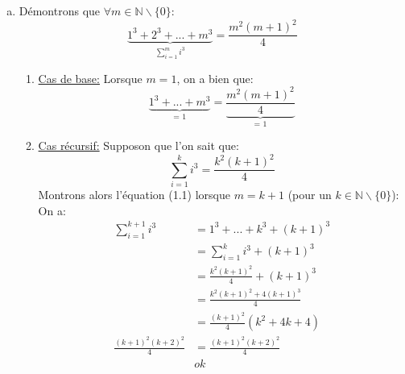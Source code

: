 \documentclass{report}
\begin{document}



  
  
\section{} %
  \begin{enumerate}[a. ]
  \addtocounter{enumi}{1} %
  \item 

	D\'{e}montrons que $\forall m \in \mathbb{N} \backslash  \big\{0\big\} : $
	\newline
      	\begin{equation}  \underbrace{1^{3} +  2^{3} + ... +  m^{3}}_\text{$\sum_{i=1}^{m} i^{3}$} =  \frac{ m^{2} (m+1)	^{2}}{4} \end{equation}
      	                                                                                                                	        
      	                                                                                                                	         
  \begin{enumerate}[\textperiodcentered]

     \item \underline{Cas de base:}
      \newline Lorsque  $m=1$, on a bien que: \newline
      	\[  \underbrace{1^{3} + ... +  m^{3}}_\text{= 1} =  \underbrace{\frac{ m^{2} (m+1)^{2}}{4}}_\text{= 1} \]
	     
	     
	     
      \item \underline{Cas r\'{e}cursif:}
      \newline
      Supposon que l'on sait que:
      \newline
      \[ \sum_{i=1}^{k} i^{3} = \frac{ k^{2} (k+1)^{2}}{4}\]
      \newline
      Montrons alors l'\'{e}quation (1.1) lorsque $m = k+1$ (pour un $k \in \mathbb{N} \backslash  \big\{0\big\}$):
      \newline
      On a:
      \begin{align*}
       \sum_{i=1}^{k+1} i^{3}  &= 1^{3} + ... +  k^{3} + (k+1)^{3}\\
       &= \sum_{i=1}^{k} i^{3} + (k+1)^{3}\\
       &= \frac{k^{2}(k+1)^{2}}{4} + (k+1)^{3}\\
       &= \frac{k^{2}(k+1)^{2}+4(k+1)^{3}}{4}\\ 
       &= \frac{(k+1)^{2}}{4}(k^{2}+4k+4)\\
       \frac{(k+1)^{2}(k+2)^{2}}{4} &= \frac{(k+1)^{2}(k+2)^{2}}{4}\\
       &ok
     \end{align*}
     \end{enumerate}



  

  
  
  \end{enumerate}

 
 
\end{document}
